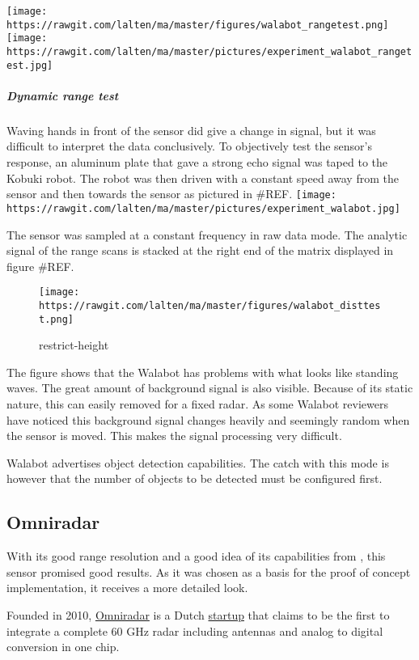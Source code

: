 \texttt{[image: https://rawgit.com/lalten/ma/master/figures/walabot\_rangetest.png]}
\texttt{[image: https://rawgit.com/lalten/ma/master/pictures/experiment\_walabot\_rangetest.jpg]}

\subparagraph{Dynamic range test}\label{dynamic-range-test}

Waving hands in front of the sensor did give a change in signal, but it
was difficult to interpret the data conclusively. To objectively test
the sensor's response, an aluminum plate that gave a strong echo signal
was taped to the Kobuki robot. The robot was then driven with a constant
speed away from the sensor and then towards the sensor as pictured in
\#REF.
\texttt{[image: https://rawgit.com/lalten/ma/master/pictures/experiment\_walabot.jpg]}

The sensor was sampled at a constant frequency in raw data mode. The
analytic signal of the range scans is stacked at the right end of the
matrix displayed in figure \#REF.

\begin{figure}
\centering
\texttt{[image: https://rawgit.com/lalten/ma/master/figures/walabot\_disttest.png]}
\caption{restrict-height}
\end{figure}

The figure shows that the Walabot has problems with what looks like
standing waves. The great amount of background signal is also visible.
Because of its static nature, this can easily removed for a fixed radar.
As some Walabot reviewers have noticed \cite{Valens2016} this background
signal changes heavily and seemingly random when the sensor is moved.
This makes the signal processing very difficult.

Walabot advertises object detection capabilities. The catch with this
mode is however that the number of objects to be detected must be
configured first.

\subsection{Omniradar}\label{omniradar}

With its good range resolution and a good idea of its capabilities from
\cite{Ernst2016}, this sensor promised good results. As it was chosen as
a basis for the proof of concept implementation, it receives a more
detailed look.

Founded in 2010, \href{https://www.omniradar.com/}{Omniradar} is a Dutch
\href{https://www.crunchbase.com/organization/omniradar}{startup} that
claims to be the first to integrate a complete 60 GHz radar including
antennas and analog to digital conversion in one chip.

